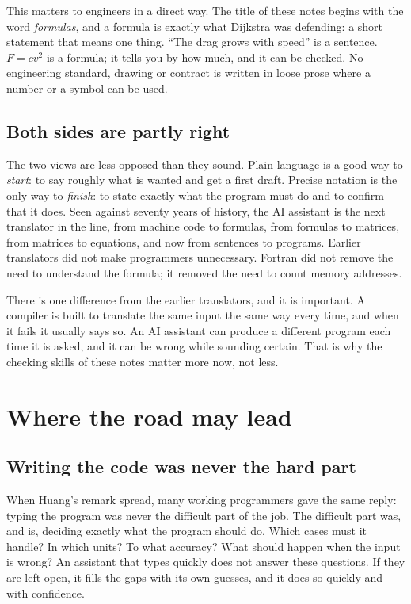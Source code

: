 This matters to engineers in a direct way. The title of these notes begins with the word
\emph{formulas}, and a formula is exactly what Dijkstra was defending: a short statement
that means one thing. ``The drag grows with speed'' is a sentence. $F = c v^2$ is a
formula; it tells you by how much, and it can be checked. No engineering standard, drawing
or contract is written in loose prose where a number or a symbol can be used.

\subsection*{Both sides are partly right}

The two views are less opposed than they sound. Plain language is a good way to
\emph{start}: to say roughly what is wanted and get a first draft. Precise notation is
the only way to \emph{finish}: to state exactly what the program must do and to confirm
that it does. Seen against seventy years of history, the AI assistant is the next
translator in the line, from machine code to formulas, from formulas to matrices, from
matrices to equations, and now from sentences to programs. Earlier translators did not
make programmers unnecessary. Fortran did not remove the need to understand the formula;
it removed the need to count memory addresses.

There is one difference from the earlier translators, and it is important. A compiler is
built to translate the same input the same way every time, and when it fails it usually
says so. An AI assistant can produce a different program each time it is asked, and it
can be wrong while sounding certain. That is why the checking skills of these notes
matter more now, not less.

\section*{Where the road may lead}

\subsection*{Writing the code was never the hard part}

When Huang's remark spread, many working programmers gave the same reply: typing the
program was never the difficult part of the job. The difficult part was, and is,
deciding exactly what the program should do. Which cases must it handle? In which units?
To what accuracy? What should happen when the input is wrong? An assistant that types
quickly does not answer these questions. If they are left open, it fills the gaps with
its own guesses, and it does so quickly and with confidence.

